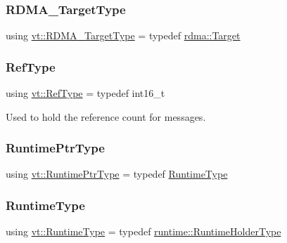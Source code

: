 \mbox{\label{namespacevt_a9bf03a57102d0274cc229b9ef94bb59e}} 
\subsubsection{\texorpdfstring{R\+D\+M\+A\+\_\+\+Target\+Type}{RDMA\_TargetType}}
{\footnotesize\ttfamily using \hyperlink{namespacevt_a9bf03a57102d0274cc229b9ef94bb59e}{vt\+::\+R\+D\+M\+A\+\_\+\+Target\+Type} = typedef \hyperlink{structvt_1_1rdma_1_1_target}{rdma\+::\+Target}}

\mbox{\label{namespacevt_a9b39ce9494bb04674d0d5b895a5aa50f}} 
\subsubsection{\texorpdfstring{Ref\+Type}{RefType}}
{\footnotesize\ttfamily using \hyperlink{namespacevt_a9b39ce9494bb04674d0d5b895a5aa50f}{vt\+::\+Ref\+Type} = typedef int16\+\_\+t}



Used to hold the reference count for messages. 

\mbox{\label{namespacevt_a0ce60e0299d8fa32223b3b9ffa0af466}} 
\subsubsection{\texorpdfstring{Runtime\+Ptr\+Type}{RuntimePtrType}}
{\footnotesize\ttfamily using \hyperlink{namespacevt_a0ce60e0299d8fa32223b3b9ffa0af466}{vt\+::\+Runtime\+Ptr\+Type} = typedef \hyperlink{namespacevt_a5c1db2c048b259a2ba8961766ddb9278}{Runtime\+Type}}

\mbox{\label{namespacevt_a5c1db2c048b259a2ba8961766ddb9278}} 
\subsubsection{\texorpdfstring{Runtime\+Type}{RuntimeType}}
{\footnotesize\ttfamily using \hyperlink{namespacevt_a5c1db2c048b259a2ba8961766ddb9278}{vt\+::\+Runtime\+Type} = typedef \hyperlink{namespacevt_1_1runtime_ab09d044cce417fbcdb7e1e29b7aabbc3}{runtime\+::\+Runtime\+Holder\+Type}}

